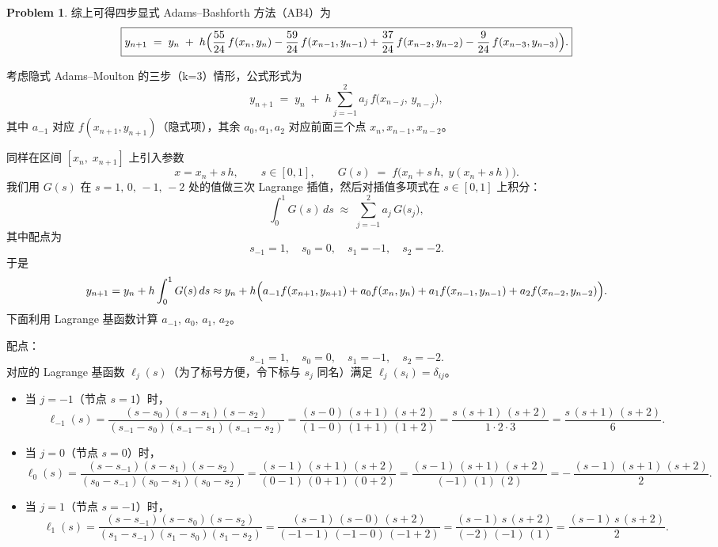\documentclass[a4paper]{article}
\theoremstyle{definition}
\newtheorem{problem}{Problem}
\theoremstyle{plain}
\newcommand{\<}{\left<}
\renewcommand{\>}{\right>}
\numberwithin{equation}{problem}
\begin{document}
\begin{problem}
综上可得四步显式 Adams–Bashforth 方法（AB4）为
\[
\boxed{
y_{n+1} \;=\; y_n 
\;+\; h \Bigl(
   \frac{55}{24}\,f(x_n,y_n)
 - \frac{59}{24}\,f(x_{n-1},y_{n-1})
 + \frac{37}{24}\,f(x_{n-2},y_{n-2})
 - \frac{9}{24}\,f(x_{n-3},y_{n-3})
\Bigr).
}
\]

\bigskip



考虑隐式 Adams–Moulton 的三步（k=3）情形，公式形式为
\[
y_{n+1} \;=\; y_n \;+\; h \sum_{j=-1}^{2} a_j \, f\bigl(x_{n-j},\,y_{n-j}\bigr),
\]
其中 $a_{-1}$ 对应 $f(x_{n+1},y_{n+1})$（隐式项），其余 $a_0,a_1,a_2$ 对应前面三个点 $x_n,x_{n-1},x_{n-2}$。  

同样在区间 $[x_n,\;x_{n+1}]$ 上引入参数
\[
x = x_n + s\,h,\qquad s \in [0,1],
\qquad 
G(s) \;=\; f\bigl(x_n + s\,h,\;y(x_n + s\,h)\bigr).
\]
我们用 $G(s)$ 在 $s = 1,\,0,\,-1,\,-2$ 处的值做三次 Lagrange 插值，然后对插值多项式在 $s\in[0,1]$ 上积分：
\[
\int_{0}^{1} G(s)\,ds
\;\approx\;
\sum_{j = -1}^{2} a_j \, G\bigl(s_j\bigr),
\]
其中配点为
\[
s_{-1} = 1,\quad s_0 = 0,\quad s_1 = -1,\quad s_2 = -2.
\]
于是
\[
y_{n+1} 
= y_n 
+ h \int_{0}^{1} G(s)\,ds
\approx
y_n 
+ h \Bigl(
  a_{-1} f(x_{n+1},y_{n+1})
+ a_{0} f(x_{n},y_{n})
+ a_{1} f(x_{n-1},y_{n-1})
+ a_{2} f(x_{n-2},y_{n-2})
\Bigr).
\]
下面利用 Lagrange 基函数计算 $a_{-1},\,a_0,\,a_1,\,a_2$。

\medskip


配点：
\[
s_{-1} = 1,\quad s_{0} = 0,\quad s_{1} = -1,\quad s_{2} = -2.
\]
对应的 Lagrange 基函数 $\ell_j(s)$（为了标号方便，令下标与 $s_j$ 同名）满足 $\ell_j(s_i) = \delta_{ij}$。  

\begin{itemize}
  \item 当 $j = -1$（节点 $s = 1$）时，
    \[
    \ell_{-1}(s)
    = \frac{(s - s_0)(s - s_1)(s - s_2)}
           {(s_{-1} - s_0)(s_{-1} - s_1)(s_{-1} - s_2)}
    = \frac{(s - 0)\,(s + 1)\,(s + 2)}
           {(1 - 0)\,(1 + 1)\,(1 + 2)}
    = \frac{s\,(s + 1)\,(s + 2)}{1 \cdot 2 \cdot 3}
    = \frac{s\,(s + 1)\,(s + 2)}{6}.
    \]
  
  \item 当 $j = 0$（节点 $s = 0$）时，
    \[
    \ell_{0}(s)
    = \frac{(s - s_{-1})(s - s_{1})(s - s_{2})}
           {(s_{0} - s_{-1})(s_{0} - s_{1})(s_{0} - s_{2})}
    = \frac{(s - 1)\,(s + 1)\,(s + 2)}
           {(0 - 1)\,(0 + 1)\,(0 + 2)}
    = \frac{(s - 1)\,(s + 1)\,(s + 2)}{(-1)\,(1)\,(2)}
    = -\,\frac{(s - 1)\,(s + 1)\,(s + 2)}{2}.
    \]
  
  \item 当 $j = 1$（节点 $s = -1$）时，
    \[
    \ell_{1}(s)
    = \frac{(s - s_{-1})(s - s_{0})(s - s_{2})}
           {(s_{1} - s_{-1})(s_{1} - s_{0})(s_{1} - s_{2})}
    = \frac{(s - 1)\,(s - 0)\,(s + 2)}
           {(-1 - 1)\,(-1 - 0)\,(-1 + 2)}
    = \frac{(s - 1)\,s\,(s + 2)}{(-2)\,(-1)\,(1)}
    = \frac{(s - 1)\,s\,(s + 2)}{2}.
    \]
  

\end{itemize}
\end{problem}
\end{document}
